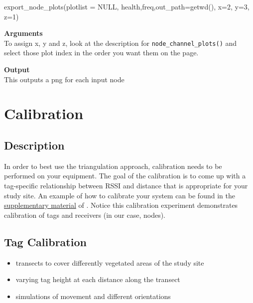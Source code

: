 \documentclass[
]{book}
\newenvironment{Shaded}{\begin{snugshade}}{\end{snugshade}}
\newcommand{\AttributeTok}[1]{\textcolor[rgb]{0.77,0.63,0.00}{#1}}
\newcommand{\ConstantTok}[1]{\textcolor[rgb]{0.00,0.00,0.00}{#1}}
\newcommand{\DecValTok}[1]{\textcolor[rgb]{0.00,0.00,0.81}{#1}}
\newcommand{\FunctionTok}[1]{\textcolor[rgb]{0.00,0.00,0.00}{#1}}
\newcommand{\NormalTok}[1]{#1}
\providecommand{\tightlist}{%
  \setlength{\itemsep}{0pt}\setlength{\parskip}{0pt}}
\begin{document}
\begin{Shaded}
\begin{Highlighting}[]
\FunctionTok{export\_node\_plots}\NormalTok{(}\AttributeTok{plotlist =} \ConstantTok{NULL}\NormalTok{, health,freq,}\AttributeTok{out\_path=}\FunctionTok{getwd}\NormalTok{(), }\AttributeTok{x=}\DecValTok{2}\NormalTok{, }\AttributeTok{y=}\DecValTok{3}\NormalTok{, }\AttributeTok{z=}\DecValTok{1}\NormalTok{)  }
\end{Highlighting}
\end{Shaded}

\textbf{Arguments}\\
To assign x, y and z, look at the description for \texttt{node\_channel\_plots()} and select those plot index in the order you want them on the page.

\textbf{Output}\\
This outputs a png for each input node

\hypertarget{calibration}{%
\chapter{Calibration}\label{calibration}}

\hypertarget{description}{%
\section{Description}\label{description}}

In order to best use the triangulation approach, calibration needs to be performed on your equipment. The goal of the calibration is to come up with a tag-specific relationship between RSSI and distance that is appropriate for your study site. An example of how to calibrate your system can be found in the \href{https://academic.oup.com/beheco/article/31/4/873/5840921?login=true\#supplementary-data}{supplementary material} of \citet{bircher2020extraterritorial}. Notice this calibration experiment demonstrates calibration of tags and receivers (in our case, nodes).

\hypertarget{tag-calibration}{%
\section{Tag Calibration}\label{tag-calibration}}

\begin{itemize}
\tightlist
\item
  transects to cover differently vegetated areas of the study site\\
\item
  varying tag height at each distance along the transect\\
\item
  simulations of movement and different orientations
\end{itemize}
\end{document}
